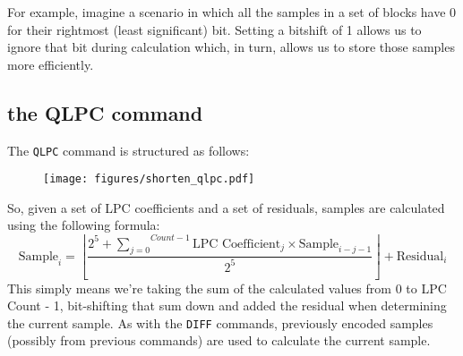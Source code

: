 For example, imagine a scenario in which all the samples in a set of
blocks have 0 for their rightmost (least significant) bit.
Setting a bitshift of 1 allows us to ignore that bit during
calculation which, in turn, allows us to store those samples more
efficiently.

\pagebreak

\subsection{the QLPC command}

The \texttt{QLPC} command is structured as follows:

\begin{figure}[h]
\texttt{[image: figures/shorten\_qlpc.pdf]}
\end{figure}
\par
\noindent
So, given a set of LPC coefficients and a set of residuals,
samples are calculated using the following formula:
\begin{equation}
\text{Sample}_i = \left\lfloor \frac{2 ^ 5 + \overset{Count - 1}{\underset{j = 0}{\sum}}
  \text{LPC Coefficient}_j \times \text{Sample}_{i - j - 1} } {2 ^ 5}\right\rfloor + \text{Residual}_i
\end{equation}
This simply means we're taking the sum of the calculated values from
0 to LPC Count - 1, bit-shifting that sum down and added the residual
when determining the current sample.
As with the \texttt{DIFF} commands, previously encoded samples
(possibly from previous commands) are used to calculate the current
sample.


